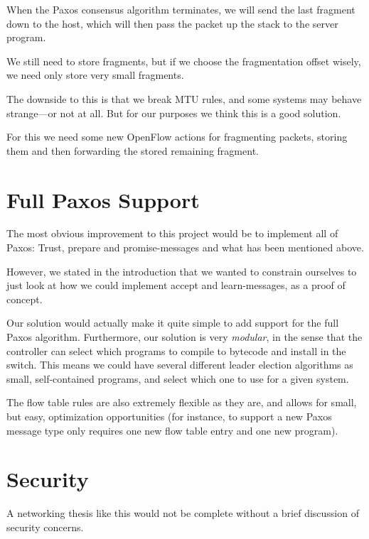 {When the Paxos consensus algorithm terminates, we will send the last
fragment down to the host, which will then pass the packet up the stack to
the server program.

We still need to store fragments, but if we choose the fragmentation offset
wisely, we need only store very small fragments.

The downside to this is that we break MTU rules, and some systems may behave
strange---or not at all.  But for our purposes we think this is a good
solution.

For this we need some new OpenFlow actions for fragmenting packets, storing
them and then forwarding the stored remaining fragment.

\section{Full Paxos Support}

The most obvious improvement to this project would be to implement all of
Paxos: Trust, prepare and
promise-messages and what has been mentioned above.

However, we stated in the introduction that we wanted to constrain ourselves
to just look at how we could implement accept and learn-messages, as a
proof of concept.

Our solution would actually make it quite simple to add support for the full
Paxos algorithm.  Furthermore, our solution is very \textit{modular}, in the
sense that the controller can select which programs to compile to bytecode
and install in the switch.  This means we could have several different
leader election algorithms as small, self-contained programs, and select
which one to use for a given system.

The flow table rules are also extremely flexible as they are, and allows for
small, but easy, optimization opportunities (for instance, to support a new
Paxos message type only requires one new flow table entry and one new
program).


\section{Security}

A networking thesis like this would not be complete without a brief
discussion of security concerns.

}

